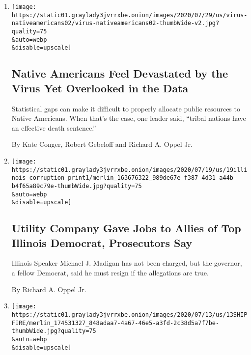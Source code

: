 \begin{enumerate}
\def\labelenumi{\arabic{enumi}.}
\item
  \href{/2020/07/30/us/native-americans-coronavirus-data.html}{}

  \texttt{[image: https://static01.graylady3jvrrxbe.onion/images/2020/07/29/us/virus-nativeamericans02/virus-nativeamericans02-thumbWide-v2.jpg?quality=75\\\&auto=webp\\\&disable=upscale]}

  \hypertarget{native-americans-feel-devastated-by-the-virus-yet-overlooked-in-the-data}{%
  \subsection{Native Americans Feel Devastated by the Virus Yet
  Overlooked in the
  Data}\label{native-americans-feel-devastated-by-the-virus-yet-overlooked-in-the-data}}

  Statistical gaps can make it difficult to properly allocate public
  resources to Native Americans. When that's the case, one leader said,
  ``tribal nations have an effective death sentence.''

  By Kate Conger, Robert Gebeloff and Richard A. Oppel Jr.
\item
  \href{/2020/07/17/us/illinois-michael-madigan.html}{}

  \texttt{[image: https://static01.graylady3jvrrxbe.onion/images/2020/07/19/us/19illinois-corruption-print1/merlin\_163676322\_989de67e-f387-4d31-a44b-b4f65a89c79e-thumbWide.jpg?quality=75\\\&auto=webp\\\&disable=upscale]}

  \hypertarget{utility-company-gave-jobs-to-allies-of-top-illinois-democrat-prosecutors-say}{%
  \subsection{Utility Company Gave Jobs to Allies of Top Illinois
  Democrat, Prosecutors
  Say}\label{utility-company-gave-jobs-to-allies-of-top-illinois-democrat-prosecutors-say}}

  Illinois Speaker Michael J. Madigan has not been charged, but the
  governor, a fellow Democrat, said he must resign if the allegations
  are true.

  By Richard A. Oppel Jr.
\item
  \href{/2020/07/13/us/naval-ship-fire-san-diego.html}{}

  \texttt{[image: https://static01.graylady3jvrrxbe.onion/images/2020/07/13/us/13SHIPFIRE/merlin\_174531327\_848adaa7-4a67-46e5-a3fd-2c38d5a7f7be-thumbWide.jpg?quality=75\\\&auto=webp\\\&disable=upscale]}


\end{enumerate}
